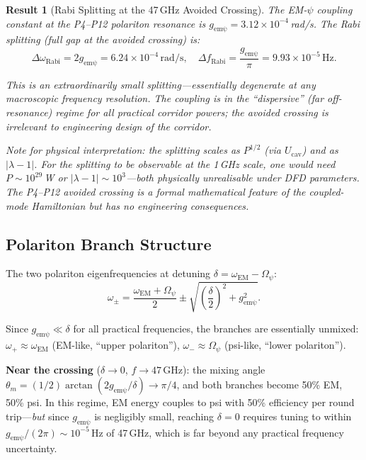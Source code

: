 \documentclass[aps,prd,twocolumn,superscriptaddress]{revtex4-2}
\newtheorem{result}{Result}
\begin{document}
\begin{result}[Rabi Splitting at the 47\,GHz Avoided Crossing]
The EM-$\psi$ coupling constant at the P4--P12 polariton resonance is
$g_\mathrm{em\psi} = 3.12\times10^{-4}$\,rad/s.  The Rabi splitting
(full gap at the avoided crossing) is:
\begin{equation}
\boxed{
\Delta\omega_\mathrm{Rabi} = 2g_\mathrm{em\psi} = 6.24\times10^{-4}\,\mathrm{rad/s},
\quad
\Delta f_\mathrm{Rabi} = \frac{g_\mathrm{em\psi}}{\pi} = 9.93\times10^{-5}\,\mathrm{Hz}.
}
\label{eq:rabi_splitting}
\end{equation}

This is an extraordinarily small splitting---essentially degenerate
at any macroscopic frequency resolution.  The coupling is in the
``dispersive'' (far off-resonance) regime for all practical corridor
powers; the avoided crossing is irrelevant to engineering design
of the corridor.

Note for physical interpretation: the splitting scales as $P^{1/2}$
(via $U_\mathrm{cav}$) and as $|\lambda-1|$.  For the splitting to
be observable at the 1\,GHz scale, one would need
$P\sim 10^{29}$\,W or $|\lambda-1|\sim 10^3$---both physically unrealisable
under DFD parameters.  The P4--P12 avoided crossing is a formal mathematical
feature of the coupled-mode Hamiltonian but has no engineering consequences.
\end{result}

\subsection{Polariton Branch Structure}

The two polariton eigenfrequencies at detuning $\delta = \omega_\mathrm{EM} - \Omega_\psi$:
\begin{equation}
\omega_\pm = \frac{\omega_\mathrm{EM} + \Omega_\psi}{2}
\pm \sqrt{\left(\frac{\delta}{2}\right)^2 + g_\mathrm{em\psi}^2}.
\label{eq:polariton_branches}
\end{equation}

Since $g_\mathrm{em\psi} \ll \delta$ for all practical frequencies,
the branches are essentially unmixed:
$\omega_+ \approx \omega_\mathrm{EM}$ (EM-like, ``upper polariton''),
$\omega_- \approx \Omega_\psi$ (psi-like, ``lower polariton'').

\textbf{Near the crossing} ($\delta \to 0$, $f \to 47$\,GHz):
the mixing angle $\theta_m = (1/2)\arctan(2g_\mathrm{em\psi}/\delta) \to \pi/4$,
and both branches become 50\% EM, 50\% psi.  In this regime, EM energy
couples to psi with 50\% efficiency per round trip---\emph{but} since
$g_\mathrm{em\psi}$ is negligibly small, reaching $\delta = 0$ requires
tuning to within $g_\mathrm{em\psi}/(2\pi) \sim 10^{-5}$\,Hz of 47\,GHz,
which is far beyond any practical frequency uncertainty.
\end{document}
